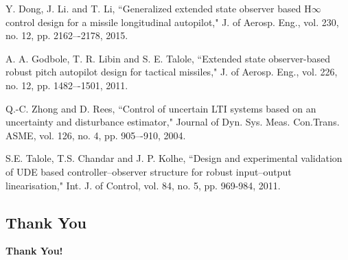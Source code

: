 \documentclass[table,10pt,red]{beamer}	%
\begin{document}
	\begin{thebibliography}{1}



%
%




 Y. Dong, J. Li. and T. Li, ``Generalized extended state observer based H$\infty$ control design for a missile longitudinal autopilot," J. of Aerosp. Eng., vol. 230, no. 12, pp. 2162–-2178, 2015. \label{geso}

 A. A. Godbole, T. R. Libin and S. E. Talole, ``Extended state observer-based robust pitch autopilot design for tactical missiles," J. of Aerosp. Eng., vol. 226, no. 12, pp. 1482–-1501, 2011. \label{eso}

  Q.-C. Zhong and D. Rees, ``Control of uncertain LTI systems based on an uncertainty and disturbance estimator," Journal of Dyn. Sys. Meas. Con.Trans. ASME, vol. 126, no. 4, pp. 905–-910, 2004. \label{ude1}

 S.E. Talole, T.S. Chandar and J. P. Kolhe, ``Design and experimental validation of UDE based controller--observer structure for robust input--output linearisation," Int. J. of Control, vol. 84, no. 5, pp. 969-984, 2011. \label{talole2011}


\end{thebibliography}
\subsection*{Thank You} %
\begin{frame}
\textbf{\LARGE Thank You!} \\[20pt]
\end{frame}
\end{document}
